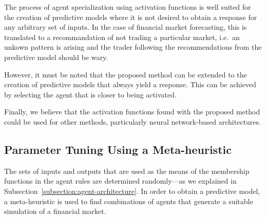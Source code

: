 ﻿\documentclass{ieeeaccess}
\begin{document}
The process of agent specialization using activation functions is well suited
for the creation of predictive models where it is not desired to obtain a
response for any arbitrary set of inputs. In the case of financial market
forecasting, this is translated to a recommandation of not trading a
particular market, i.e.\ an unkown pattern is arising and the trader following
the recommendations from the predictive model should be wary.

However, it must be noted that the proposed method can be extended to the
creation of predictive models that always yield a response. This can be
achieved by selecting the agent that is closer to being activated.

Finally, we believe that the activation functions found with the
proposed method could be used for other methods, particularly neural
network-based architectures.



\subsection{Parameter Tuning Using a Meta-heuristic} %
\label{subsection:meta-heuristic}


The sets of inputs and outputs that are used as the means of the
membership functions in the agent rules are determined randomly---as
we explained in Subsection~\ref{subsection:agent-architecture}. In
order to obtain a predictive model, a meta-heuristic is used to find
combinations of agents that generate a suitable simulation of a
financial market.
\end{document}
